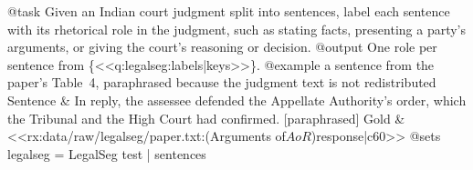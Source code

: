 @task
Given an Indian court judgment split into sentences, label each sentence with its rhetorical role in the judgment,
such as stating facts, presenting a party's arguments, or giving the court's reasoning or decision.
@output
One role per sentence from \{<<q:legalseg:labels|keys>>\}.
@example a sentence from the paper's Table~4, paraphrased because the judgment text is not redistributed
Sentence & In reply, the assessee defended the Appellate Authority's order, which the Tribunal and the High Court had confirmed. [paraphrased]
Gold & <<rx:data/raw/legalseg/paper.txt:(Arguments of\nRespondent \(AoR\))\nIn response|c60>>
@sets
legalseg = LegalSeg test | sentences

